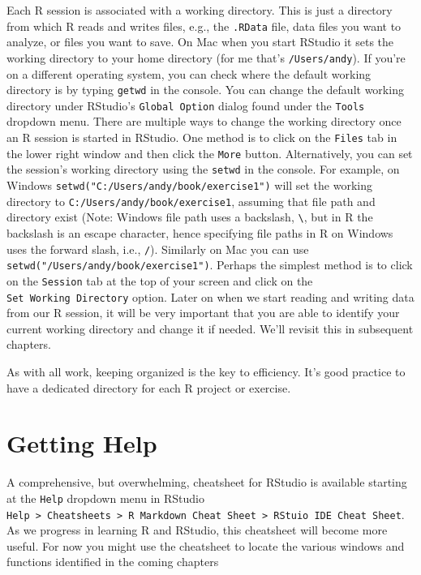 \documentclass[
]{krantz}
\begin{document}
Each R session is associated with a working directory. This is just a directory from which R reads and writes files, e.g., the \texttt{.RData} file, data files you want to analyze, or files you want to save. On Mac when you start RStudio it sets the working directory to your home directory (for me that's \texttt{/Users/andy}). If you're on a different operating system, you can check where the default working directory is by typing \texttt{getwd} in the console. You can change the default working directory under RStudio's \texttt{Global\ Option} dialog found under the \texttt{Tools} dropdown menu. There are multiple ways to change the working directory once an R session is started in RStudio. One method is to click on the \texttt{Files} tab in the lower right window and then click the \texttt{More} button. Alternatively, you can set the session's working directory using the \texttt{setwd} in the console. For example, on Windows \texttt{setwd("C:/Users/andy/book/exercise1")} will set the working directory to \texttt{C:/Users/andy/book/exercise1}, assuming that file path and directory exist (Note: Windows file path uses a backslash, \texttt{\textbackslash{}}, but in R the backslash is an escape character, hence specifying file paths in R on Windows uses the forward slash, i.e., \texttt{/}). Similarly on Mac you can use \texttt{setwd("/Users/andy/book/exercise1")}. Perhaps the simplest method is to click on the \texttt{Session} tab at the top of your screen and click on the \texttt{Set\ Working\ Directory} option. Later on when we start reading and writing data from our R session, it will be very important that you are able to identify your current working directory and change it if needed. We'll revisit this in subsequent chapters.

As with all work, keeping organized is the key to efficiency. It's good practice to have a dedicated directory for each R project or exercise.

\hypertarget{getting-help}{%
\section{Getting Help}\label{getting-help}}

A comprehensive, but overwhelming, cheatsheet for RStudio is available starting at the \texttt{Help} dropdown menu in RStudio \texttt{Help\ \textgreater{}\ Cheatsheets\ \textgreater{}\ R\ Markdown\ Cheat\ Sheet\ \textgreater{}\ RStuio\ IDE\ Cheat\ Sheet}. As we progress in learning R and RStudio, this cheatsheet will become more useful. For now you might use the cheatsheet to locate the various windows and functions identified in the coming chapters
\end{document}
